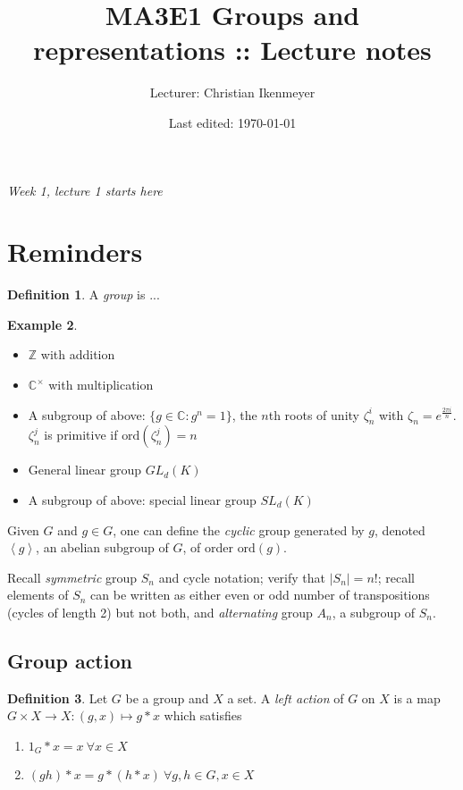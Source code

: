 \documentclass{article}
\title{MA3E1 Groups and representations :: Lecture notes}
\author{Lecturer: Christian Ikenmeyer}
\date{Last edited: \today}
\newcommand{\la}{\left\langle}
\newcommand{\ra}{\right\rangle}
\newcommand{\Z}{\mathbb{Z}}
\newcommand{\C}{\mathbb{C}}
\newcommand{\ord}{\text{ord}}
\theoremstyle{definition}
\newtheorem{defn}{Definition}[subsection]
\newtheorem{example}[defn]{Example}
\begin{document}
\maketitle
\thispagestyle{empty}

\tableofcontents
\thispagestyle{empty}
\newpage
\setcounter{page}{1}

\begin{flushright}
\textit{Week 1, lecture 1 starts here}
\end{flushright}

\section{Reminders}
\begin{defn}
A \textit{group} is ...
\end{defn}

\begin{example}
\begin{itemize}
\item $\Z$ with addition
\item $\C^\times$ with multiplication
\item A subgroup of above: $\{g\in\C:g^n=1\}$, the $n$th roots of unity $\zeta_n^i$ with $\zeta_n=e^{\frac{2\pi i}{n}}$. $\zeta_n^j$ is primitive if $\ord(\zeta_n^j)=n$
\item General linear group $GL_d(K)$
\item A subgroup of above: special linear group $SL_d(K)$
\end{itemize}
\end{example}

Given $G$ and $g\in G$, one can define the \textit{cyclic} group generated by $g$, denoted $\la g\ra$, an abelian subgroup of $G$, of order $\ord(g)$.

Recall \textit{symmetric} group $S_n$ and cycle notation; verify that $|S_n|=n!$; recall elements of $S_n$ can be written as either even or odd number of transpositions (cycles of length 2) but not both, and \textit{alternating} group $A_n$, a subgroup of $S_n$.

\subsection{Group action}

\begin{defn}
Let $G$ be a group and $X$ a set. A \textit{left action} of $G$ on $X$ is a map $G\times X\rightarrow X:(g,x)\mapsto g\ast x$ which satisfies
\begin{enumerate}
\item $1_G\ast x=x \ \forall x\in X$
\item $(gh)\ast x=g\ast(h\ast x) \ \forall g,h\in G,x\in X$
\end{enumerate}
\end{defn}
\end{document}
